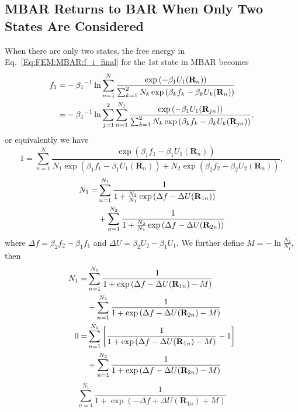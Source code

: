\begin{appendices}
\chapter{MBAR Returns to BAR When Only Two States Are Considered\label{chapter:Appendix:twostatMBAR2BAR}}
When there are only two states, the free energy in Eq.~\ref{Eq:FEM:MBAR:f_i_final} for the 1st state in MBAR becomes
\begin{align}
f_1=&-{\beta_1}^{-1}\ln{\sum\limits_{n=1}^N \frac{\exp{\left(-\beta_1 U_1(\mathbf{R}_n)\right)}}{\sum_{k=1}^{2}N_k\exp{\left(\beta_kf_k-\beta_kU_k(\mathbf{R}_n)\right)}}}\notag\\
   =&-{\beta_1}^{-1}\ln{\sum\limits_{j=1}^{2}\sum\limits_{n=1}^{N_j} \frac{\exp{\left(-\beta_1 U_1(\mathbf{R}_{jn})\right)}}{\sum_{k=1}^{2}N_k\exp{\left(\beta_kf_k-\beta_kU_k(\mathbf{R}_{jn})\right)}}},
\end{align}
or equivalently we have
\begin{equation}
1=\sum\limits_{n=1}^{N} \frac{\exp{\left(\beta_1 f_1-\beta_1 U_1(\mathbf{R}_{n})\right)}}{N_1\exp{\left(\beta_1f_1-\beta_1U_1(\mathbf{R}_{n})\right)}+N_2\exp{\left(\beta_2f_2-\beta_2U_2(\mathbf{R}_{n})\right)}},
\end{equation}
\begin{align}
N_1=&\sum\limits_{n=1}^{N_1} \frac{1}{1+\frac{N_2}{N_1}\exp{\left(\Delta f-\Delta U(\mathbf{R}_{1n})\right)}}\notag\\
    &+\sum\limits_{n=1}^{N_2} \frac{1}{1+\frac{N_2}{N_1}\exp{\left(\Delta f-\Delta U(\mathbf{R}_{2n})\right)}}\notag\\
\end{align}
where $\Delta f=\beta_2 f_2-\beta_1 f_1$ and $\Delta U=\beta_2 U_2-\beta_1 U_1$. We further define $M=-\ln{\frac{N_2}{N_1}}$, then
\begin{align}    
N_1=&\sum\limits_{n=1}^{N_1} \frac{1}{1+\exp{\left(\Delta f-\Delta U(\mathbf{R}_{1n})-M\right)}}\notag\\
    &+\sum\limits_{n=1}^{N_2} \frac{1}{1+\exp{\left(\Delta f-\Delta U(\mathbf{R}_{2n})-M\right)}}\notag\\
0=&\sum\limits_{n=1}^{N_1}\left[ \frac{1}{1+\exp{\left(\Delta f-\Delta U(\mathbf{R}_{1n})-M\right)}}-1\right]\notag\\
  &+\sum\limits_{n=1}^{N_2} \frac{1}{1+\exp{\left(\Delta f-\Delta U(\mathbf{R}_{2n})-M\right)}}\notag
\end{align}
\begin{equation}
\sum\limits_{n=1}^{N_1}\frac{1}{1+\exp{\left(-\Delta f+\Delta U(\mathbf{R}_{1n})+M\right)}}

\end{equation}
\end{appendices}
